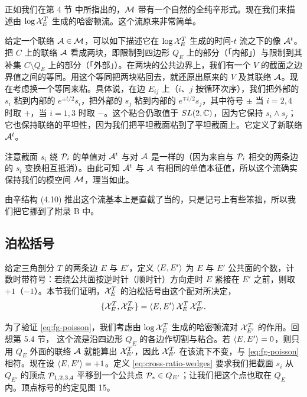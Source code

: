 正如我们在第 4 节%
中所指出的，$\mathcal{M}$ 带有一个自然的全纯辛形式。现在我们来描述由 $\log \mathcal{X}^T_E$ 生成的哈密顿流。这个流原来非常简单。

给定一个联络 $\mathcal{A}\in\mathcal{M}$，可以如下描述它在 $\log\mathcal{X}^T_E$ 生成的时间-$t$ 流之下的像 $\mathcal{A}^t$。把 $C$ 上的联络 $\mathcal{A}$ 看成两块，即限制到四边形 $Q_E$ 上的部分（「内部」）与限制到其补集 $C\setminus Q_E$ 上的部分（「外部」）。在两块的公共边界上，我们有一个 $V$ 的截面之边界值之间的等同。用这个等同把两块粘回去，就还原出原来的 $V$ 及其联络 $\mathcal{A}$。现在考虑换一个等同来粘。具体说，在边 $E_{ij}$ 上（$i$、$j$ 按循环次序），我们把外部的 $s_i$ 粘到内部的 $e^{\pm t/2}s_i$，把外部的 $s_j$ 粘到内部的 $e^{\mp t/2}s_j$，其中符号 $\pm$ 当 $i=2,4$ 时取 $+$，当 $i=1,3$ 时取 $-$。这个粘合仍取值于 $SL(2,\mathbb{C})$，因为它保持 $s_i\wedge s_j$；它也保持联络的平坦性，因为我们把平坦截面粘到了平坦截面上。它定义了新联络 $\mathcal{A}^t$。

注意截面 $s_i$ 绕 $\mathcal{P}_i$ 的单值对 $\mathcal{A}^t$ 与对 $\mathcal{A}$ 是一样的（因为来自与 $\mathcal{P}_i$ 相交的两条边的 $s_i$ 变换相互抵消）。由此可知 $\mathcal{A}^t$ 与 $\mathcal{A}$ 有相同的单值本征值，所以这个流确实保持我们的模空间 $\mathcal{M}$，理当如此。

由辛结构 (4.10)%
推出这个流基本上是直截了当的，只是记号上有些笨拙，所以我们把它挪到了附录 B%
中。

\subsection{泊松括号}
\label{sec:poisson}

给定三角剖分 $T$ 的两条边 $E$ 与 $E'$，定义 $\langle E,E' \rangle$ 为 $E$ 与 $E'$ 公共面的个数，计数时带符号：若绕公共面按逆时针（顺时针）方向走时 $E$ 紧接在 $E'$ 之前，则取 $+1$（$-1$）。本节我们证明，$\mathcal{X}^T_E$ 的泊松括号由这个配对所决定，
\begin{equation}\label{eq:fg-poisson}
\{\mathcal{X}^T_E,\mathcal{X}^T_{E'}\} = \langle E,E' \rangle\,\mathcal{X}^T_E\,\mathcal{X}^T_{E'}.
\end{equation}

为了验证 \eqref{eq:fg-poisson}，我们考虑由 $\log\mathcal{X}^T_E$ 生成的哈密顿流对 $\mathcal{X}^T_{E'}$ 的作用。回想第 5.4 节，%
这个流是沿四边形 $Q_E$ 的各边作切割与粘合。若 $\langle E,E' \rangle=0$，则只用 $Q_E$ 外面的联络 $\mathcal{A}$ 就能算出 $\mathcal{X}^T_{E'}$，因此 $\mathcal{X}^T_{E'}$ 在该流下不变，与 \eqref{eq:fg-poisson} 相符。现在设 $\langle E,E' \rangle=+1$。定义 \eqref{eq:cross-ratio-wedges} 要求我们把截面 $s_i$ 从 $Q_{E'}$ 的顶点 $\mathcal{P}_{1,2,3,4}$ 平移到一个公共点 $\mathcal{P}_*\in Q_{E'}$；让我们把这个点也取在 $Q_E$ 内。顶点标号的约定见图 15。%

